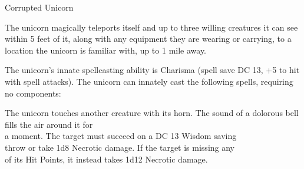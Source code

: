 \begin{DndMonster}[width=0.5\textwidth]{Corrupted Unicorn\label{monster:CorruptedUnicorn}}
	\DndMonsterAttack[
		name			= Horn,
		distance		= melee,	%
		mod				= +6,
		reach			= 5,
		targets			= one target,
		dmg				= \DndDice{1d8 + 4},
		dmg-type		= Piercing,
	]
	
	The unicorn magically teleports itself and up to three willing creatures it can see within 5 feet of it, along with any equipment they are wearing or carrying, to a location the unicorn is familiar with, up to 1 mile away.
	
	\begin{DndMonsterSpells}
		\item[Innate Spellcasting] The unicorn's innate spellcasting ability is Charisma (spell save DC 13, +5 to hit with spell attacks). The unicorn can innately cast the following spells, requiring no components:
	\end{DndMonsterSpells}
	
	The unicorn touches another creature with its horn. The sound of a dolorous bell fills the air around it for\\a moment. The target must succeed on a DC 13 Wisdom saving\\throw or take 1d8 Necrotic damage. If the target is missing any\\of its Hit Points, it instead takes 1d12 Necrotic damage.
\end{DndMonster}